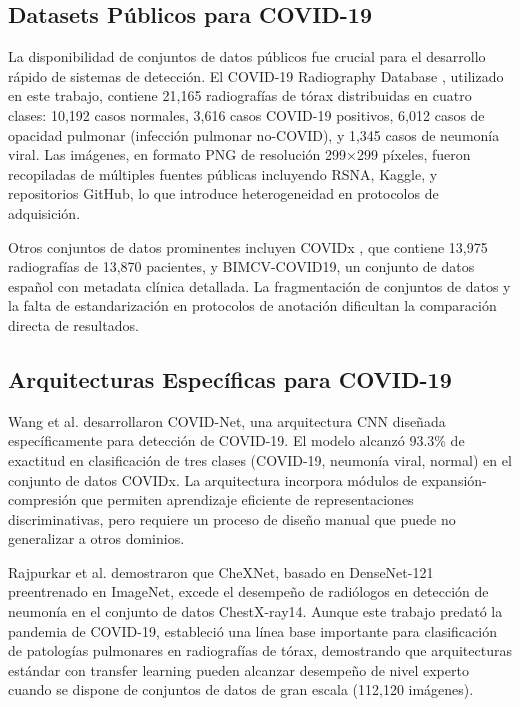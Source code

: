 \subsection{Datasets Públicos para COVID-19}

La disponibilidad de conjuntos de datos públicos fue crucial para el desarrollo rápido de sistemas de detección. El COVID-19 Radiography Database \cite{chowdhury2020can}, utilizado en este trabajo, contiene 21,165 radiografías de tórax distribuidas en cuatro clases: 10,192 casos normales, 3,616 casos COVID-19 positivos, 6,012 casos de opacidad pulmonar (infección pulmonar no-COVID), y 1,345 casos de neumonía viral. Las imágenes, en formato PNG de resolución 299$\times$299 píxeles, fueron recopiladas de múltiples fuentes públicas incluyendo RSNA, Kaggle, y repositorios GitHub, lo que introduce heterogeneidad en protocolos de adquisición.

Otros conjuntos de datos prominentes incluyen COVIDx \cite{wang2020covidnet}, que contiene 13,975 radiografías de 13,870 pacientes, y BIMCV-COVID19, un conjunto de datos español con metadata clínica detallada. La fragmentación de conjuntos de datos y la falta de estandarización en protocolos de anotación dificultan la comparación directa de resultados.

\subsection{Arquitecturas Específicas para COVID-19}

Wang et al. \cite{wang2020covidnet} desarrollaron COVID-Net, una arquitectura CNN diseñada específicamente para detección de COVID-19. El modelo alcanzó 93.3\% de exactitud en clasificación de tres clases (COVID-19, neumonía viral, normal) en el conjunto de datos COVIDx. La arquitectura incorpora módulos de expansión-compresión que permiten aprendizaje eficiente de representaciones discriminativas, pero requiere un proceso de diseño manual que puede no generalizar a otros dominios.

Rajpurkar et al. \cite{rajpurkar2017chexnet} demostraron que CheXNet, basado en DenseNet-121 preentrenado en ImageNet, excede el desempeño de radiólogos en detección de neumonía en el conjunto de datos ChestX-ray14. Aunque este trabajo predató la pandemia de COVID-19, estableció una línea base importante para clasificación de patologías pulmonares en radiografías de tórax, demostrando que arquitecturas estándar con transfer learning pueden alcanzar desempeño de nivel experto cuando se dispone de conjuntos de datos de gran escala (112,120 imágenes).

